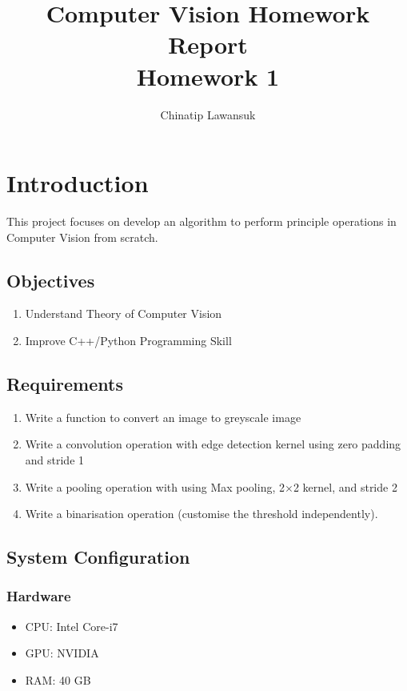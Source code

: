 \documentclass[12pt,a4paper]{report}
\title{Computer Vision Homework Report \\ \Large Homework 1}
\author{Chinatip Lawansuk}
\date{}
\begin{document}
\maketitle

\tableofcontents

\chapter{Introduction}
This project focuses on develop an algorithm to perform principle operations in Computer Vision from scratch.

\section{Objectives}
\begin{enumerate}
  \item Understand Theory of Computer Vision
  \item Improve C++/Python Programming Skill
\end{enumerate}

\section{Requirements}
\begin{enumerate}
  \item Write a function to convert an image to greyscale image
  \item Write a convolution operation with edge detection kernel using zero padding and stride 1
  \item Write a pooling operation with using Max pooling, 2$\times$2 kernel, and  stride 2
  \item Write a binarisation operation (customise the threshold independently).
\end{enumerate}

\section{System Configuration}
\subsection{Hardware}
\begin{itemize}
  \item CPU\@: Intel Core-i7
  \item GPU\@: NVIDIA
  \item RAM\@: 40 GB
\end{itemize}
\end{document}
